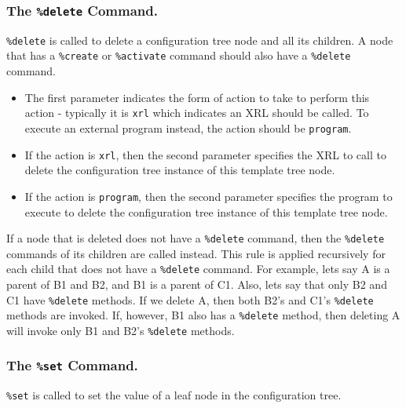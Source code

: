 \documentclass[11pt]{article}
\begin{document}

\subsubsection{The {\tt \%delete} Command.}
{\tt \%delete} is called to delete a configuration tree node and all its
children.  A node that has a {\tt \%create} or {\tt \%activate}
command should also have a {\tt \%delete} command.

\begin{itemize}
  \item The first parameter indicates the form of action to take to perform
  this action - typically it is {\tt xrl} which indicates an XRL should
  be called.
  To execute an external program instead, the action should be {\tt program}.

  \item If the action is {\tt xrl}, then the second parameter specifies the
  XRL to call to delete the configuration tree instance of this template
  tree node.

  \item If the action is {\tt program}, then the second parameter specifies the
  program to execute to delete the configuration tree instance of this
  template tree node.

\end{itemize}

If a node that is deleted does not have a {\tt \%delete} command, then
the {\tt \%delete} commands of its children are called instead.
This rule is applied recursively for each child that does not have
a {\tt \%delete} command.
For example, lets say A is a parent of B1 and B2, and B1 is a parent of C1.
Also, lets say that only B2 and C1 have {\tt \%delete} methods.
If we delete A, then both B2's and C1's {\tt \%delete} methods are invoked.
If, however, B1 also has a {\tt \%delete} method, then deleting A will invoke
only B1 and B2's {\tt \%delete} methods.

\subsubsection{The {\tt \%set} Command.}

{\tt \%set} is called to set the value of a leaf node in the
configuration tree.
\end{document}
